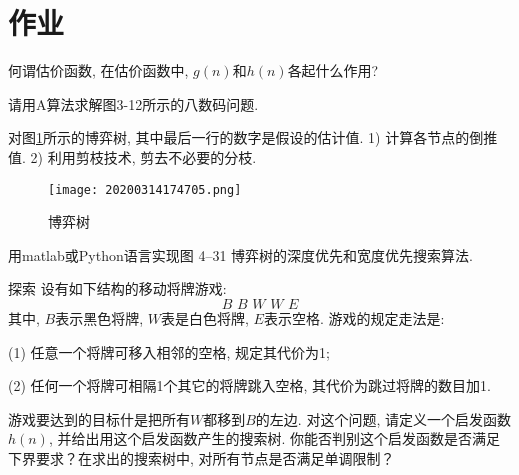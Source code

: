 \section{作业}
\begin{think}
    何谓估价函数, 在估价函数中, $g(n)$和$h(n)$各起什么作用?
\end{think}

\begin{think}
    请用A算法求解图3-12所示的八数码问题.
\end{think}

\begin{think}
    对图\ref{20200314174705fig51}所示的博弈树, 其中最后一行的数字是假设的估计值. 1) 计算各节点的倒推值. 2) 利用剪枝技术, 剪去不必要的分枝.
\begin{figure}[H]
    \centering
    \texttt{[image: 20200314174705.png]}
    \caption{博弈树}
    \label{20200314174705fig51}
\end{figure}
\end{think}
\begin{think}
    用matlab或Python语言实现图 4–31 博弈树的深度优先和宽度优先搜索算法.
\end{think}
\begin{custom}[explorecolor]{探索}
设有如下结构的移动将牌游戏:
$$B\,\,	B\,\,		W\,\,		W\,\,		E$$
其中, $B$表示黑色将牌, $W$表是白色将牌, $E$表示空格. 游戏的规定走法是:

(1) 任意一个将牌可移入相邻的空格, 规定其代价为1;

(2) 任何一个将牌可相隔1个其它的将牌跳入空格, 其代价为跳过将牌的数目加1.

游戏要达到的目标什是把所有$W$都移到$B$的左边. 对这个问题, 请定义一个启发函数$h(n)$, 并给出用这个启发函数产生的搜索树. 你能否判别这个启发函数是否满足下界要求？在求出的搜索树中, 对所有节点是否满足单调限制？
\end{custom}




